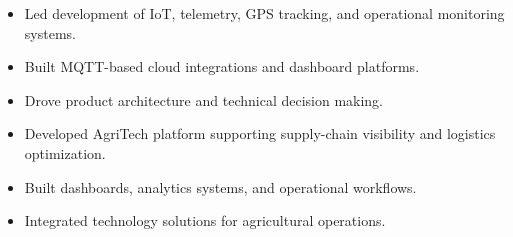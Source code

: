 \documentclass[10pt,a4paper,withhyper]{altacv}
\begin{document}
\divider


\begin{itemize}
\item Led development of IoT, telemetry, GPS tracking, and operational monitoring systems.
\item Built MQTT-based cloud integrations and dashboard platforms.
\item Drove product architecture and technical decision making.
\end{itemize}

\divider


\begin{itemize}
\item Developed AgriTech platform supporting supply-chain visibility and logistics optimization.
\item Built dashboards, analytics systems, and operational workflows.
\item Integrated technology solutions for agricultural operations.
\end{itemize}



\end{document}
